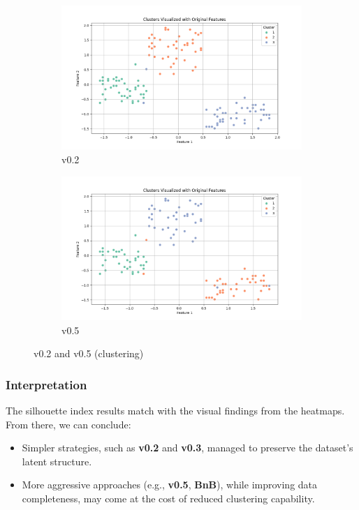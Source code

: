 \documentclass[a4paper,12pt]{article}
\begin{document}
\begin{figure}[H]
\centering
\begin{subfigure}{0.48\textwidth}
\includegraphics[width=\linewidth]{results_Cluster_v2.png}
\caption{v0.2}
\end{subfigure}
\hfill
\begin{subfigure}{0.48\textwidth}
\includegraphics[width=\linewidth]{results_Cluster_v0_5.png}
\caption{v0.5}
\end{subfigure}
\caption{v0.2 and v0.5 (clustering)}
\end{figure}

\subsubsection{Interpretation}

The silhouette index results match with the visual findings from the heatmaps. From there, we can conclude:

\begin{itemize}
    \item Simpler strategies, such as \textbf{v0.2} and \textbf{v0.3}, managed to preserve the dataset's latent structure.
    
    \item More aggressive approaches (e.g., \textbf{v0.5}, \textbf{BnB}), while improving data completeness, may come at the cost of reduced clustering capability.
\end{itemize}
\end{document}
